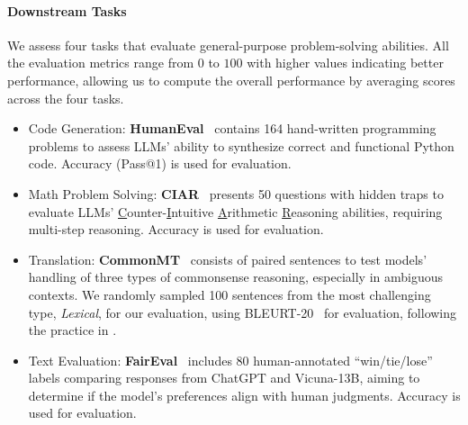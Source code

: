 \documentclass{article}
\theoremstyle{plain}
\theoremstyle{definition}
\theoremstyle{remark}
\begin{document}
\paragraph{Downstream Tasks}
We assess four tasks that evaluate general-purpose problem-solving abilities.
All the evaluation metrics range from $0$ to $100$ with higher values indicating better performance, allowing us to compute the overall performance by averaging scores across the four tasks.
\begin{itemize}[leftmargin=*]
    \item Code Generation: \textbf{HumanEval}~\cite{chen2021evaluating} contains 164 hand-written programming problems to assess LLMs' ability to synthesize correct and functional Python code. Accuracy (Pass@1) is used for evaluation.
    \item Math Problem Solving: \textbf{CIAR}~\cite{liang2023encouraging} presents 50 questions with hidden traps to evaluate LLMs' \underline{C}ounter-\underline{I}ntuitive \underline{A}rithmetic \underline{R}easoning abilities, requiring multi-step reasoning. Accuracy is used for evaluation.
    \item Translation: \textbf{CommonMT}~\cite{he2020box} consists of paired sentences to test models' handling of three types of commonsense reasoning, especially in ambiguous contexts. We randomly sampled 100 sentences from the most challenging type, \textit{Lexical}, for our evaluation, using BLEURT-20~\cite{sellam2020bleurt, pu2021learning} for evaluation, following the practice in \citet{liang2023encouraging}.
    \item Text Evaluation: \textbf{FairEval}~\cite{wang2023large} includes 80 human-annotated ``win/tie/lose'' labels comparing responses from ChatGPT and Vicuna-13B, aiming to determine if the model's preferences align with human judgments. Accuracy is used for evaluation.
\end{itemize}

\begin{table}[t]
    \centering
    \caption{Details of the six multi-agent systems. ``Num.'' is the number of agents. ``Final Agent'' denotes the agent that output the final results.}
    \label{tab:system-intro}
\end{table}
\end{document}
